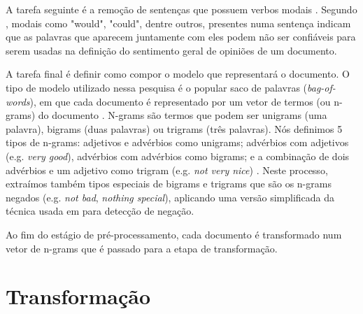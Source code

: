 A tarefa seguinte é a remoção de sentenças que possuem verbos modais . Segundo , modais como "would", "could", dentre outros, presentes numa sentença indicam que as palavras que aparecem juntamente com eles podem não ser confiáveis para serem usadas na definição do sentimento geral de opiniões de um documento. 

A tarefa final é definir como compor o modelo que representará o documento. O tipo de modelo utilizado nessa pesquisa é o popular saco de palavras (\textit{bag-of-words}), em que cada documento é representado por um vetor de termos (ou n-grams) do documento \cite{moraes2012document}. N-grams são termos que podem ser unigrams (uma palavra), bigrams (duas palavras) ou trigrams (três palavras).  Nós definimos 5 tipos de n-grams: adjetivos e advérbios como unigrams; advérbios com adjetivos (e.g. \textit{very good}), advérbios com advérbios como bigrams; e a combinação de dois advérbios e um adjetivo como trigram (e.g. \textit{not very nice}) \cite{pang2002thumbs, turney2002thumbs, taboada2008extracting, karamibekr2012verb}. Neste processo, extraímos também tipos especiais de bigrams e trigrams  que são os n-grams negados (e.g. \textit{not bad}, \textit{nothing special}), aplicando uma versão simplificada da técnica usada em \cite{taboada2011lexicon} para detecção de negação.  

Ao fim do estágio de pré-processamento, cada documento é transformado num vetor de n-grams que é passado para a etapa de transformação.  

\section{Transformação}


